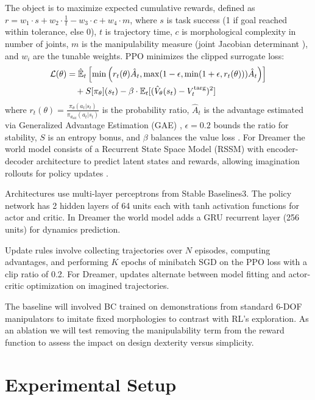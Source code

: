 \documentclass[conference]{IEEEtran}
\begin{document}
The object is to maximize expected cumulative rewards, defined as $r = w_1 \cdot s + w_2 \cdot \frac{1}{t} - w_3 \cdot c + w_4 \cdot m$, where $s$ is task success (1 if goal reached within tolerance, else 0), $t$ is trajectory time, $c$ is morphological complexity in number of joints, $m$ is the manipulability measure (joint Jacobian determinant \cite{yoshikawa1985manipulability}), and $w_i$ are the tunable weights.
PPO minimizes the clipped surrogate loss:
\begin{align}
\mathcal{L}(\theta) &= \hat{\mathbb{E}}_t \left[ \min\left(r_t(\theta) \hat{A}_t, \max(1-\epsilon, \min(1+\epsilon, r_t(\theta))) \hat{A}_t\right) \right] \notag \\
&\quad + S[\pi_\theta](s_t) - \beta \cdot \mathbb{E}_t [(\hat{V}_\theta(s_t) - V_t^{\text{targ}})^2]
\end{align}
where $r_t(\theta) = \frac{\pi_\theta(a_t|s_t)}{\pi_{\theta_{\text{old}}}(a_t|s_t)}$ is the probability ratio, $\hat{A}_t$ is the advantage estimated via Generalized Advantage Estimation (GAE) \cite{schulman2015high}, $\epsilon=0.2$ bounds the ratio for stability, $S$ is an entropy bonus, and $\beta$ balances the value loss \cite{schulman2017proximal}.
For Dreamer the world model consists of a Recurrent State Space Model (RSSM) with encoder-decoder architecture to predict latent states and rewards, allowing imagination rollouts for policy updates \cite{hafner2019dream}.

Architectures use multi-layer perceptrons from Stable Baselines3.
The policy network has 2 hidden layers of 64 units each with tanh activation functions for actor and critic.
In Dreamer the world model adds a GRU recurrent layer (256 units) for dynamics prediction.

Update rules involve collecting trajectories over $N$ episodes, computing advantages, and performing $K$ epochs of minibatch SGD on the PPO loss with a clip ratio of 0.2.
For Dreamer, updates alternate between model fitting and actor-critic optimization on imagined trajectories.

The baseline will involved BC trained on demonstrations from standard 6-DOF manipulators to imitate fixed morphologies to contrast with RL's exploration.
As an ablation we will test removing the manipulability term from the reward function to assess the impact on design dexterity versus simplicity.

\section{Experimental Setup}
\end{document}
